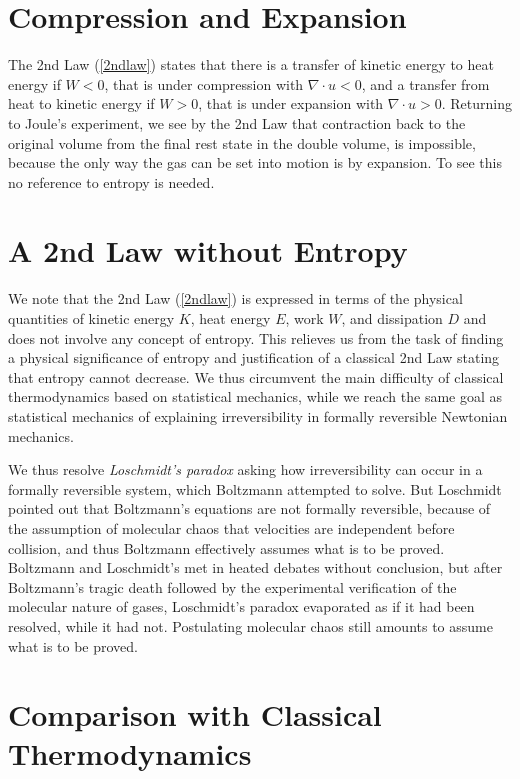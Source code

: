 \section{Compression and Expansion}

The 2nd Law (\ref{2ndlaw}) states that there is a transfer
of kinetic energy to heat energy if $W<0$, that is under compression
with $\nabla\cdot u<0$, and a transfer from heat to kinetic energy 
if $W>0$, that is under expansion with $\nabla\cdot u>0$. 
Returning to Joule's experiment, we see by the 2nd Law that contraction back
to the original volume from the final rest state in the double volume,
is impossible, because the only way the gas can be set into motion is 
by expansion. To see this no reference to entropy is needed.

\section{A 2nd Law without Entropy}

We note that the 2nd Law (\ref{2ndlaw}) is expressed in terms of 
the physical quantities of kinetic energy $K$, heat energy $E$, work $W$,
and dissipation $D$ and does not involve any concept of entropy. 
This relieves us from the task of finding a physical significance of 
entropy and justification of a classical 2nd Law stating that entropy
cannot decrease.
We thus circumvent the main difficulty of classical thermodynamics
based on statistical mechanics, while we reach the same goal 
as statistical mechanics
of explaining irreversibility in formally reversible Newtonian mechanics.

We thus resolve \emph{Loschmidt's paradox} \cite{loschmidt} asking 
how irreversibility can occur in a formally reversible system,
which Boltzmann attempted to solve. 
But Loschmidt pointed out that Boltzmann's equations
are not formally reversible, because of the assumption of
molecular chaos that velocities are independent before
collision, and thus Boltzmann effectively assumes what is to be proved.
Boltzmann and Loschmidt's met in heated debates without conclusion,
but after Boltzmann's tragic death followed by the experimental verification
of the molecular nature of gases, Loschmidt's paradox
evaporated as if it had been resolved, while it had not. 
Postulating molecular chaos still amounts to
assume what is to be proved.

\section{Comparison with Classical Thermodynamics}

